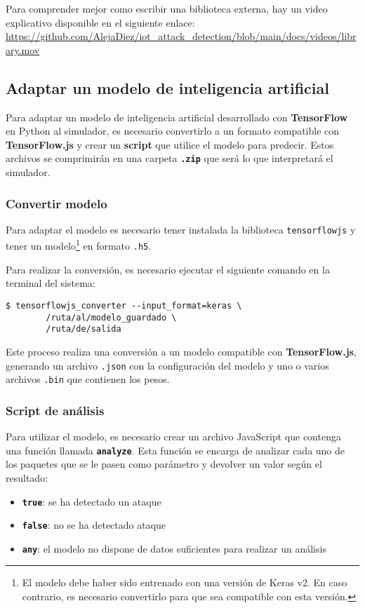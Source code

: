 Para comprender mejor como escribir una biblioteca externa, hay un video explicativo disponible en el siguiente enlace: \url{https://github.com/AlejaDiez/iot_attack_detection/blob/main/docs/videos/library.mov}

\subsection{Adaptar un modelo de inteligencia artificial}
\label{subsec:AdaptarModelo}
Para adaptar un modelo de inteligencia artificial desarrollado con \textbf{TensorFlow} en Python al simulador, es necesario convertirlo a un formato compatible con \textbf{TensorFlow.js} y crear un \textbf{script} que utilice el modelo para predecir. Estos archivos se comprimirán en una carpeta \textbf{\texttt{.zip}} que será lo que interpretará el simulador.

\subsubsection{Convertir modelo}
\label{subsubsec:AdaptarModeloConvertir}
Para adaptar \cite{tensorflowjs} el modelo es necesario tener instalada la biblioteca \texttt{tensorflowjs} y tener un modelo\footnote{El modelo debe haber sido entrenado con una versión de Keras v2. En caso contrario, es necesario convertirlo para que sea compatible con esta versión.} en formato \texttt{.h5}.

Para realizar la conversión, es necesario ejecutar el siguiente comando en la terminal del sistema:
\begin{verbatim}
$ tensorflowjs_converter --input_format=keras \
        /ruta/al/modelo_guardado \
        /ruta/de/salida
\end{verbatim}
Este proceso realiza una conversión a un modelo compatible con \textbf{TensorFlow.js}, generando un archivo \texttt{.json} con la configuración del modelo y uno o varios archivos \texttt{.bin} que contienen los pesos.

\subsubsection{Script de análisis}
\label{subsubsec:AdaptarModeloScript}
Para utilizar el modelo, es necesario crear un archivo JavaScript que contenga una función llamada \textbf{\texttt{analyze}}. Esta función se encarga de analizar cada uno de los paquetes que se le pasen como parámetro y devolver un valor según el resultado:
\begin{itemize}
    \item \textbf{\texttt{true}}: se ha detectado un ataque
    \item \textbf{\texttt{false}}: no se ha detectado ataque
    \item \textbf{\texttt{any}}: el modelo no dispone de datos suficientes para realizar un análisis
\end{itemize}

